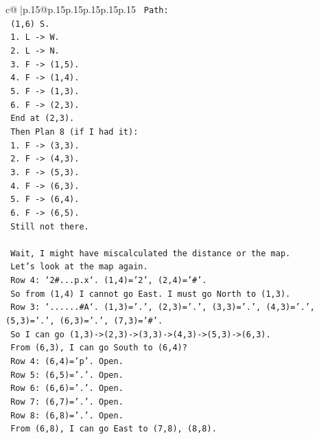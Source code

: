 \documentclass{article}
\begin{document}
{\begin{supertabular}{c@{$\;$}|p{.15\linewidth}@{}p{.15\linewidth}p{.15\linewidth}p{.15\linewidth}p{.15\linewidth}p{.15\linewidth}}
{{{\texttt{      Path:} \\
\texttt{      (1,6) S.} \\
\texttt{      1. L {-}> W.} \\
\texttt{      2. L {-}> N.} \\
\texttt{      3. F {-}> (1,5).} \\
\texttt{      4. F {-}> (1,4).} \\
\texttt{      5. F {-}> (1,3).} \\
\texttt{      6. F {-}> (2,3).} \\
\texttt{      End at (2,3).} \\
\texttt{      Then Plan 8 (if I had it):} \\
\texttt{      1. F {-}> (3,3).} \\
\texttt{      2. F {-}> (4,3).} \\
\texttt{      3. F {-}> (5,3).} \\
\texttt{      4. F {-}> (6,3).} \\
\texttt{      5. F {-}> (6,4).} \\
\texttt{      6. F {-}> (6,5).} \\
\texttt{      Still not there.} \\
\\ 
\texttt{      Wait, I might have miscalculated the distance or the map.} \\
\texttt{      Let's look at the map again.} \\
\texttt{      Row 4: `2\#...p.x`. (1,4)='2', (2,4)='\#'.} \\
\texttt{      So from (1,4) I cannot go East. I must go North to (1,3).} \\
\texttt{      Row 3: `......\#A`. (1,3)='.', (2,3)='.', (3,3)='.', (4,3)='.', (5,3)='.', (6,3)='.', (7,3)='\#'.} \\
\texttt{      So I can go (1,3){-}>(2,3){-}>(3,3){-}>(4,3){-}>(5,3){-}>(6,3).} \\
\texttt{      From (6,3), I can go South to (6,4)?} \\
\texttt{      Row 4: (6,4)='p'. Open.} \\
\texttt{      Row 5: (6,5)='.'. Open.} \\
\texttt{      Row 6: (6,6)='.'. Open.} \\
\texttt{      Row 7: (6,7)='.'. Open.} \\
\texttt{      Row 8: (6,8)='.'. Open.} \\
\texttt{      From (6,8), I can go East to (7,8), (8,8).} \\
}}}
\end{supertabular}}
\end{document}
